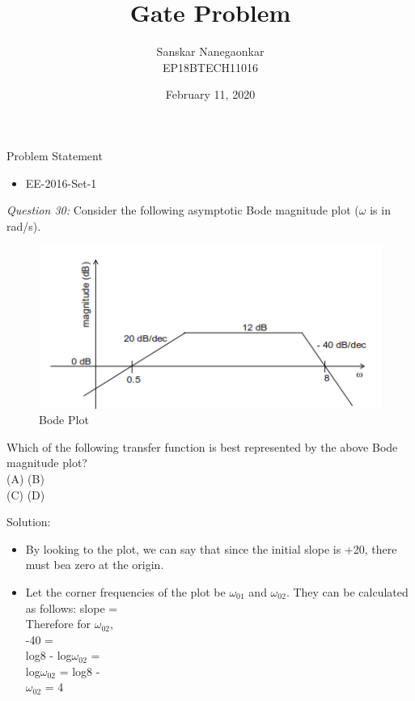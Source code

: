 \documentclass{beamer}
\title[Your Short Title]{Gate Problem}
\author{Sanskar Nanegaonkar\\EP18BTECH11016}
\institute{IIT Hyderabad}
\date{February 11, 2020}
\begin{document}
\begin{frame}
  \titlepage
\end{frame}


\begin{frame}{Problem Statement}
\begin{itemize}
    \item EE-2016-Set-1
\end{itemize}

\textit{Question 30:} Consider the following asymptotic Bode magnitude plot ($\omega$ is in rad/s).\\
\vspace{0.4cm}
\begin{figure}
\includegraphics[scale=0.6]{Ques_plot.png}
\caption{Bode Plot}
\end{figure}
\end{frame}

\begin{frame}{}
Which of the following transfer function is best represented by the above Bode magnitude plot?\\
(A) \hspace{2cm}
(B) \\
(C) \hspace{3cm}
(D) \\
\end{frame}

\begin{frame}{Solution:}
\begin{itemize}
    \item By looking to the plot, we can say that since the initial slope is +20, there must bea zero at the origin.
    \item Let the corner frequencies of the plot be $\omega_{01}$ and $\omega_{02}$. They can be calculated as follows:
    slope = \\
    Therefore for $\omega_{02}$,\\
    -40 = \\
    log8 - log$\omega_{02}$ = \\
    log$\omega_{02}$ = log8 - \\
    $\omega_{02}$ = 4\\
\end{itemize}
\end{frame}
\end{document}
